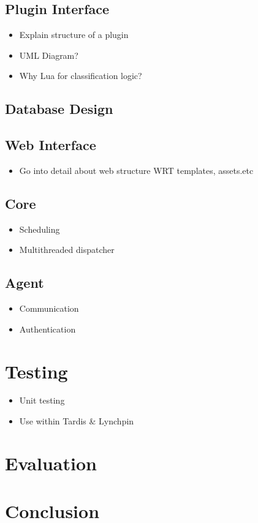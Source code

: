 \documentclass[bsc,logo,twoside]{infthesis}
\begin{document}
\section{Plugin Interface}
\begin{itemize}
	\item Explain structure of a plugin
	\item UML Diagram?
	\item Why Lua for classification logic?
\end{itemize}

\section{Database Design}

\section{Web Interface}
\begin{itemize}
	\item Go into detail about web structure WRT templates, assets.etc
\end{itemize}

\section{Core}
\begin{itemize}
	\item Scheduling
	\item Multithreaded dispatcher
\end{itemize}

\section{Agent}
\begin{itemize}
	\item Communication
	\item Authentication
\end{itemize}

\chapter{Testing}
\begin{itemize}
	\item Unit testing
	\item Use within Tardis \& Lynchpin
\end{itemize}
	
\chapter{Evaluation}

\chapter{Conclusion}
\end{document}
